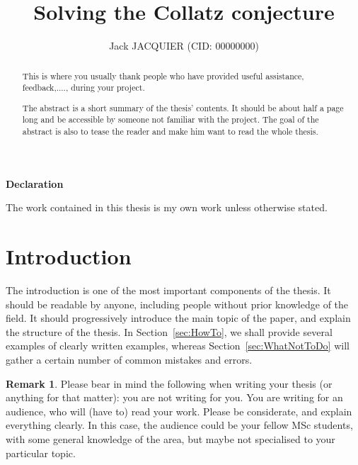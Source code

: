 \documentclass[a4paper, twoside]{report}
\title{Solving the Collatz conjecture}
\author{Jack JACQUIER (CID: 00000000)}
\theoremstyle{definition}
\newtheorem{remark}[theorem]{Remark}
\numberwithin{equation}{section}
\begin{document}


\mbox{}\newline\vspace{10mm} \mbox{}\LARGE
%
{\bf Declaration} \normalsize \vspace{5mm}

The work contained in this thesis is my own work unless otherwise stated.

\newpage

\renewcommand{\abstractname}{Acknowledgements}
\begin{abstract}
  This is where you usually thank people who have provided useful assistance, feedback,...., during your project.
\end{abstract}

\newpage

\renewcommand{\abstractname}{Abstract}
\begin{abstract}
  The abstract is a short summary of the thesis' contents.
  It should be about half a page long and be accessible by someone not familiar with the project.
  The goal of the abstract is also to tease the reader and make him want to read the whole thesis.
\end{abstract}

\tableofcontents
\listoffigures
\listoftables

\chapter*{Introduction}

The introduction is one of the most important components of the thesis.
It should be readable by anyone,
including people without prior knowledge of the field.
It should progressively introduce the main topic of the paper, and explain the structure of the thesis.
In Section~\ref{sec:HowTo}, we shall provide several examples of clearly written examples,
whereas Section~\ref{sec:WhatNotToDo} will gather a certain number of common mistakes and errors.

\begin{remark}
  Please bear in mind the following when writing your thesis (or anything for that matter):
  you are not writing for you. You are writing for an audience, who will (have to) read your work.
  Please be considerate, and explain everything clearly.
  In this case, the audience could be your fellow MSc students,
  with some general knowledge of the area, but maybe not specialised to your particular topic.
\end{remark}
\end{document}

